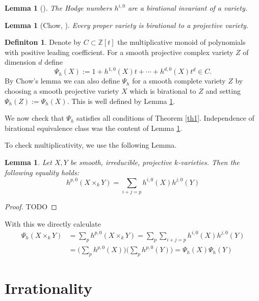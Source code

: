 \documentclass[11pt, a4paper, german]{article}
\theoremstyle{plain}
\newtheorem{lemma}[theorem]{Lemma}
\theoremstyle{definition}
\newtheorem{definition}[theorem]{Definiton}
\begin{document}
\begin{lemma}[{\cite[II Ex. 8.8]{Ha}}]
    \label{bir}
    The Hodge numbers $h^{i,0}$ are a birational invariant of a variety.
\end{lemma}

\begin{lemma}[Chow, {\cite[II Ex. 4.10]{Ha}}]
    Every proper variety is birational to a projective variety.
\end{lemma}

\begin{definition}
    Denote by $C \subset \mathbb{Z}[t]$ the multiplicative monoid of polynomials with positive leading coefficient.
    For a smooth projective complex variety $Z$ of dimension $d$ define
    \[
        \Psi_h(X) := 1 + h^{1,0}(X)t + \cdots + h^{d,0}(X)t^d \in C.
    \]
    By Chow's lemma we can also define $\Psi_h$ for a smooth complete variety $Z$ by choosing a smooth projective variety $X$ which is birational
    to $Z$ and setting $\Psi_h(Z) := \Psi_h(X)$. This is well defined by Lemma \ref{bir}.
\end{definition}

We now check that $\Psi_h$ satisfies all conditions of Theorem \ref{th1}. Independence of birational equivalence class was the content of Lemma
\ref{bir}. 

To check multiplicativity, we use the following Lemma.

\begin{lemma}
    Let $X,Y$ be smooth, irreducible, projective $k$-varieties. Then the following equality holds:
    \[
        h^{p,0}(X \times_k Y) = \sum_{i+j=p} h^{i,0}(X)h^{j,0}(Y)
    \]
\end{lemma}
\begin{proof} TODO \end{proof}

With this we directly calculate
\begin{align*}
    \Psi_h(X \times_k Y) & = \sum_p h^{p,0}(X \times_k Y) = \sum_p \sum_{i+j=p} h^{i,0}(X)h^{j,0}(Y) \\
    & = \Big (\sum_p h^{p,0}(X) \Big) \Big(\sum_p h^{p,0}(Y)\Big) = \Psi_h(X) \Psi_h(Y)
\end{align*}


\section{Irrationality}
\end{document}
